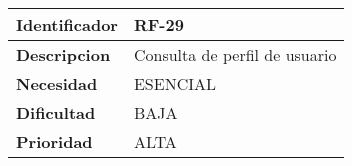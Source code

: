 \begin{center}
    \begin{tabular}{|p{2.6cm}|p{12cm}|}
    \hline
    \textbf{Identificador} & RF-29\\
    \hline
    \textbf{Descripcion} & Consulta de perfil de usuario\\
    \hline
    \textbf{Necesidad} & ESENCIAL\\
    \hline
    \textbf{Dificultad} & BAJA\\
    \hline
    \textbf{Prioridad} & ALTA\\
    \hline
    \end{tabular}
\end{center}
